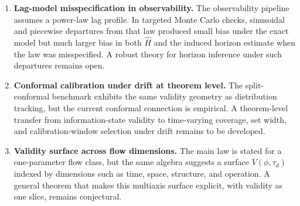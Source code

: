 \begin{enumerate}[label=\textbf{(\arabic*)},leftmargin=*,itemsep=2pt,topsep=3pt]
  \item \textbf{Lag-model misspecification in observability.}
  The observability pipeline assumes a power-law lag profile. In targeted Monte
  Carlo checks, sinusoidal and piecewise departures from that law produced small
  bias under the exact model but much larger bias in both $\widehat H$ and the
  induced horizon estimate when the law was misspecified. A robust theory for
  horizon inference under such departures remains open.

  \item \textbf{Conformal calibration under drift at theorem level.}
  The split-conformal benchmark exhibits the same validity geometry as
  distribution tracking, but the current conformal connection is empirical. A
  theorem-level transfer from information-state validity to time-varying
  coverage, set width, and calibration-window selection under drift remains to
  be developed.

  \item \textbf{Validity surface across flow dimensions.}
  The main law is stated for a one-parameter flow class, but the same algebra
  suggests a surface $V(\phi,\tau_d)$ indexed by dimensions such as time, space,
  structure, and operation. A general theorem that makes this multiaxis surface
  explicit, with validity as one slice, remains conjectural.
\end{enumerate}
